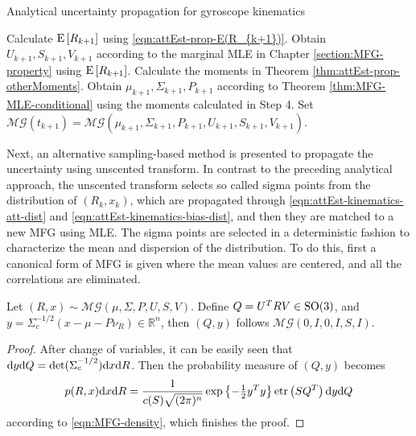 \begin{table}
	\caption{Analytical uncertainty propagation for gyroscope kinematics}
	\label{tab:attEst-prop-analytical}
	\begin{algorithmic}[1]
		\algrule[0.8pt]
		\algrule
		\State Calculate $\mathrm{E}\left[ R_{k+1} \right]$ using \eqref{eqn:attEst-prop-E(R_{k+1})}.
		\State Obtain $U_{k+1},S_{k+1},V_{k+1}$ according to the marginal MLE in Chapter \ref{section:MFG-property} using $\mathrm{E}\left[ R_{k+1} \right]$.
		\State Calculate the moments in Theorem \ref{thm:attEst-prop-otherMoments}.
		\State Obtain $\mu_{k+1},\Sigma_{k+1},P_{k+1}$ according to Theorem \ref{thm:MFG-MLE-conditional} using the moments calculated in Step 4.
		\State Set $\mathcal{MG}(t_{k+1}) = \mathcal{MG}(\mu_{k+1},\Sigma_{k+1},P_{k+1},U_{k+1},S_{k+1},V_{k+1})$.
		\EndProcedure
		\algrule[0.8pt]
	\end{algorithmic}
\end{table}

Next, an alternative sampling-based method is presented to propagate the uncertainty using unscented transform.
In contrast to the preceding analytical approach, the unscented transform selects so called sigma points from the distribution of $(R_k,x_k)$, which are propagated through \eqref{eqn:attEst-kinematics-att-dist} and \eqref{eqn:attEst-kinematics-bias-dist}, and then they are matched to a new MFG using MLE.
The sigma points are selected in a deterministic fashion to characterize the mean and dispersion of the distribution.
To do this, first a canonical form of MFG is given where the mean values are centered, and all the correlations are eliminated.
\begin{lemma}
	Let $(R,x)\sim \mathcal{MG}(\mu,\Sigma,P,U,S,V)$.
	Define $Q = U^TRV\in\mathrm{SO}(3)$, and $y = \Sigma_c^{-1/2}(x-\mu-P\nu_R)\in\mathbb{R}^n$, then $(Q,y)$ follows $\mathcal{MG}(0,I,0,I,S,I)$.
\end{lemma}
\begin{proof}
	After change of variables, it can be easily seen that $\mathrm{d} y \mathrm{d} Q = \det(\Sigma_c^{-1/2}) \mathrm{d} x \mathrm{d} R$.
	Then the probability measure of $(Q,y)$ becomes
	\begin{align*}
		p(R,x) \mathrm{d} x \mathrm{d} R =  \frac{1}{c(S)\sqrt{(2\pi)^n}} \exp\left\{ -\tfrac{1}{2}y^Ty \right\} \mathrm{etr}\left( SQ^T \right) \mathrm{d} y \mathrm{d} Q
	\end{align*}
	according to \eqref{eqn:MFG-density}, which finishes the proof.
\end{proof}

